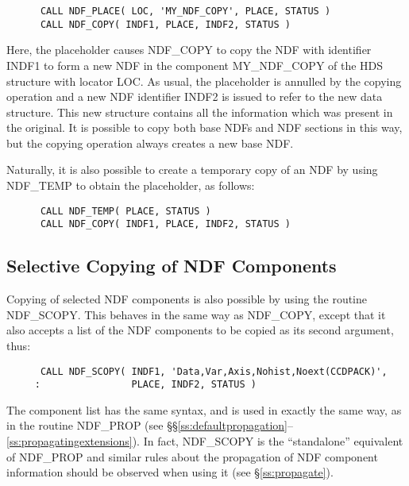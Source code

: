 \documentclass[twoside,11pt]{article}
\newcommand{\htmlref}[2]{#1}
\newcommand{\xref}[3]{#1}
\newcommand{\xlabel}[1]{}
\begin{document}
\small
\begin{verbatim}
      CALL NDF_PLACE( LOC, 'MY_NDF_COPY', PLACE, STATUS )
      CALL NDF_COPY( INDF1, PLACE, INDF2, STATUS )
\end{verbatim}
\normalsize

Here, the placeholder causes NDF\_COPY to copy the NDF with identifier
INDF1 to form a new NDF in the component MY\_NDF\_COPY of the
\xref{HDS}{sun92}{} structure with
\xref{locator}{sun92}{using_locators} LOC.
As usual, the placeholder is annulled by the copying operation and a new NDF 
identifier INDF2 is issued to refer to the new data structure.
This new structure contains all the information which was present in the 
original.
It is possible to copy both base NDFs and NDF sections in this way, but the
copying operation always creates a new base NDF. 

Naturally, it is also possible to create a temporary copy of an NDF by using
\htmlref{NDF\_TEMP}{NDF_TEMP} to obtain the placeholder, as follows:

\small
\begin{verbatim}
      CALL NDF_TEMP( PLACE, STATUS )
      CALL NDF_COPY( INDF1, PLACE, INDF2, STATUS )
\end{verbatim}
\normalsize

\subsection{\xlabel{selective_copying_of_ndf_components}\label{ss:selectivecopy}Selective Copying of NDF Components}

Copying of selected NDF components is also possible by using the
routine \htmlref{NDF\_SCOPY}{NDF_SCOPY}. This behaves in the same way as \htmlref{NDF\_COPY}{NDF_COPY}, except
that it also accepts a list of the NDF components to be copied as its
second argument, thus:

\small
\begin{verbatim}
      CALL NDF_SCOPY( INDF1, 'Data,Var,Axis,Nohist,Noext(CCDPACK)',
     :                PLACE, INDF2, STATUS )
\end{verbatim}
\normalsize

The component list has the same syntax, and is used in exactly the same
way, as in the routine \htmlref{NDF\_PROP}{NDF_PROP} (see
\S\S\ref{ss:defaultpropagation}--\ref{ss:propagatingextensions}). In
fact, NDF\_SCOPY is the ``standalone'' equivalent of NDF\_PROP and
similar rules about the propagation of NDF component information
should be observed when using it (see \S\ref{ss:propagate}).
\end{document}
